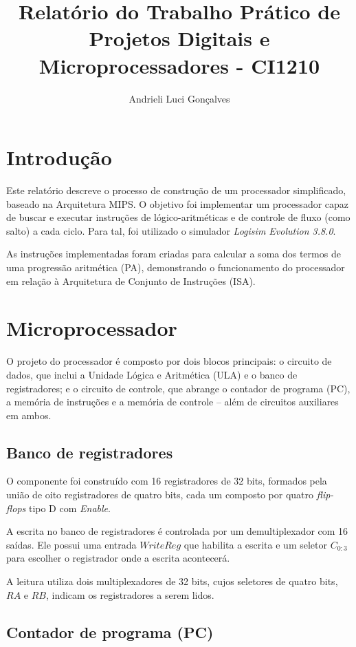 \documentclass[twocolumn, 11pt]{article}
\author{Andrieli Luci Gonçalves}
\title{Relatório do Trabalho Prático de Projetos Digitais e Microprocessadores - CI1210}
\begin{document}
\maketitle        

\section{Introdução}

Este relatório descreve o processo de construção de um processador simplificado, baseado na Arquitetura MIPS. O objetivo foi implementar um processador capaz de buscar e executar instruções de lógico-aritméticas e de controle de fluxo (como salto) a cada ciclo. Para tal, foi utilizado o simulador \textit{Logisim Evolution 3.8.0}.

As instruções implementadas foram criadas para calcular a soma dos termos de uma progressão aritmética (PA), demonstrando o funcionamento do processador em relação à Arquitetura de Conjunto de Instruções (ISA).

\section{Microprocessador}

O projeto do processador é composto por dois blocos principais: o circuito de dados, que inclui a Unidade Lógica e Aritmética (ULA) e o banco de registradores; e o circuito de controle, que abrange o contador de programa (PC), a memória de instruções e a memória de controle -- além de circuitos auxiliares em ambos.

\subsection{Banco de registradores}

O componente foi construído com 16 registradores de 32 bits, formados pela união de oito registradores de quatro bits, cada um composto por quatro \textit{flip-flops} tipo D com \textit{Enable}.

A escrita no banco de registradores é controlada por um demultiplexador com 16 saídas. Ele possui uma entrada $WriteReg$ que habilita a escrita e um seletor $C_{0:3}$ para escolher o registrador onde a escrita acontecerá.

A leitura utiliza dois multiplexadores de 32 bits, cujos seletores de quatro bits, $RA$ e $RB$, indicam os registradores a serem lidos.

\subsection{Contador de programa (PC)}
\end{document}

